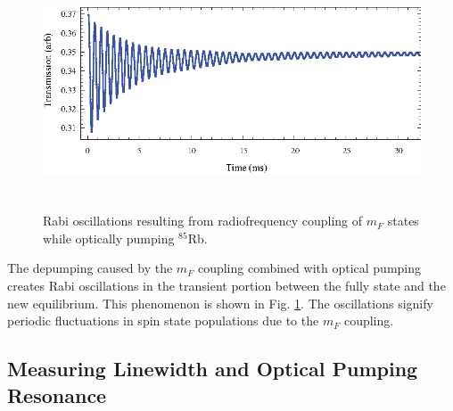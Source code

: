 \begin{figure}[htbp]
\begin{center}
\includegraphics[height=70mm]{./figures/rabi.eps}
\caption{\small{Rabi oscillations resulting from radiofrequency coupling of $m_F$ states while optically pumping $^{85}$Rb.}}
\label{fig:rabi}
\end{center}
\end{figure}
The depumping caused by the $m_F$ coupling combined with optical pumping creates Rabi oscillations in the transient portion between the fully state and the new equilibrium.  This phenomenon is shown in Fig. \ref{fig:rabi}.  The oscillations signify periodic fluctuations in spin state populations due to the $m_F$ coupling.    

\subsection{Measuring Linewidth and Optical Pumping Resonance}\label{MeasuringLinewidthandOpticalPumpingResonance}

